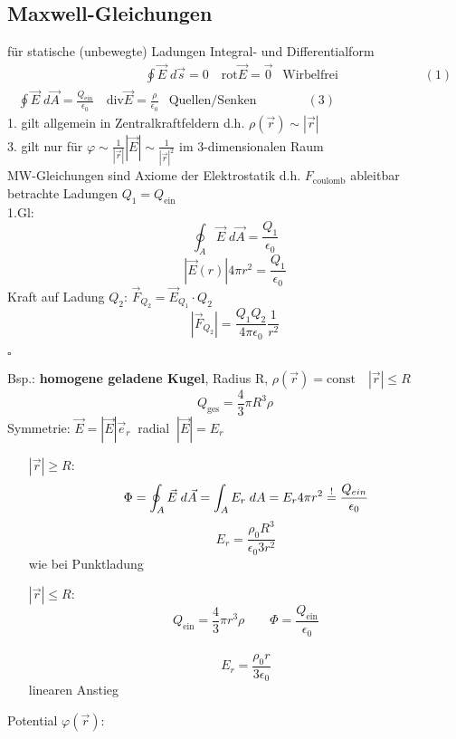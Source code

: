 \documentclass[titlepage,12pt,a4paper,ngerman]{report}
\newcommand{\tx}[1]{\textrm{#1}}
\begin{document}
\subsection{Maxwell-Gleichungen}
für statische (unbewegte) Ladungen
Integral- und Differentialform \\
\begin{eqnarray*}
\phantom{\qquad \qquad \qquad \qquad \qquad}\boxed{\oint \vec{E}\; d\vec{s} = 0 \quad \tx{rot}\vec{E} = \vec{0}\ \ \textrm{ Wirbelfrei }} \qquad \quad \qquad \quad \ \ (1)\\
\boxed{\oint \vec{E} \; d\vec{A} = \frac{Q_{\tx{ein}}}{\epsilon_0} \quad \tx{div}\vec{E}= \frac{\rho}{\epsilon_0}  \ \ \textrm{ Quellen/Senken}}  \qquad \qquad (3)
\end{eqnarray*}
1. gilt allgemein in Zentralkraftfeldern d.h. $\rho(\vec{r}) \sim |\vec{r}|$\\
3. gilt nur für $\varphi \sim \frac{1}{|\vec{r}|} | \vec{E} | \sim \frac{1}{|\vec{r}|^2}$ im 3-dimensionalen Raum\\[10pt]
MW-Gleichungen sind Axiome der Elektrostatik d.h. $F_{\tx{coulomb}}$ ableitbar\\
betrachte Ladungen $Q_1 = Q_{\tx{ein}}$\\
1.Gl: $$\oint_A \vec{E}\; d\vec{A} = \frac{Q_1}{\epsilon_0}$$
$$|\vec{E}(r)| 4 \pi r^2 = \frac{Q_1}{\epsilon_0}$$
Kraft auf Ladung $Q_2$: $\vec{F}_{Q_2} = \vec{E}_{Q_1} \cdot Q_2$
$$|\vec{F}_{Q_2}| = \frac{Q_1 Q_2}{4\pi\epsilon_0} \frac{1}{r^2}$$ 
\begin{flushright}
$\square$
\end{flushright}
Bsp.: \textbf{homogene geladene Kugel}, Radius R, $\rho(\vec{r}) = \textrm{const}\quad |\vec{r}| \le R$
$$ Q_{\tx{ges}} = \frac{4}{3} \pi R^3 \rho$$
Symmetrie:  $ \vec{E} = |\vec{E}| \vec{e}_r\ $ radial $\  |\vec{E}| = E_r$\\
\begin{itemize}
\item[$|\vec{r}|\ge R$:] $$\Phi = \oint_A \vec{E} \; d \vec{A} = \int_A E_r \; dA = E_r 4 \pi r^2 \buildrel ! \over = \frac{Q_{ein}}{\epsilon_0}$$
$$ E_r = \frac{\rho_0 R^3}{\epsilon_0 3 r^2}$$
wie bei Punktladung
\item[$|\vec{r}|\le R$:] $$ Q_{\tx{ein}} = \frac{4}{3} \pi r^3 \rho \qquad \Phi = \frac{Q_{\tx{ein}}}{\epsilon_0}$$\\
$$ E_r = \frac{\rho_0 r}{3 \epsilon_0}$$ linearen Anstieg
\end{itemize}
\noindent
Potential $\varphi(\vec{r})$:\\
\end{document}
